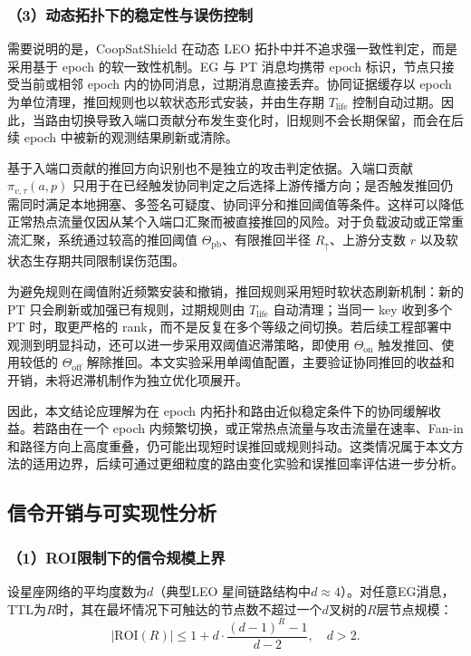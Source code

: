 \subsubsection*{（3）动态拓扑下的稳定性与误伤控制}

需要说明的是，CoopSatShield 在动态 LEO 拓扑中并不追求强一致性判定，而是采用基于 epoch 的软一致性机制。EG 与 PT 消息均携带 epoch 标识，节点只接受当前或相邻 epoch 内的协同消息，过期消息直接丢弃。协同证据缓存以 epoch 为单位清理，推回规则也以软状态形式安装，并由生存期 $T_{\text{life}}$ 控制自动过期。因此，当路由切换导致入端口贡献分布发生变化时，旧规则不会长期保留，而会在后续 epoch 中被新的观测结果刷新或清除。

基于入端口贡献的推回方向识别也不是独立的攻击判定依据。入端口贡献 $\pi_{v,\tau}(a,p)$ 只用于在已经触发协同判定之后选择上游传播方向；是否触发推回仍需同时满足本地拥塞、多签名可疑度、协同评分和推回阈值等条件。这样可以降低正常热点流量仅因从某个入端口汇聚而被直接推回的风险。对于负载波动或正常重流汇聚，系统通过较高的推回阈值 $\Theta_{\text{pb}}$、有限推回半径 $R_{\uparrow}$、上游分支数 $r$ 以及软状态生存期共同限制误伤范围。

为避免规则在阈值附近频繁安装和撤销，推回规则采用短时软状态刷新机制：新的 PT 只会刷新或加强已有规则，过期规则由 $T_{\text{life}}$ 自动清理；当同一 key 收到多个 PT 时，取更严格的 rank，而不是反复在多个等级之间切换。若后续工程部署中观测到明显抖动，还可以进一步采用双阈值迟滞策略，即使用 $\Theta_{\text{on}}$ 触发推回、使用较低的 $\Theta_{\text{off}}$ 解除推回。本文实验采用单阈值配置，主要验证协同推回的收益和开销，未将迟滞机制作为独立优化项展开。

因此，本文结论应理解为在 epoch 内拓扑和路由近似稳定条件下的协同缓解收益。若路由在一个 epoch 内频繁切换，或正常热点流量与攻击流量在速率、Fan-in 和路径方向上高度重叠，仍可能出现短时误推回或规则抖动。这类情况属于本文方法的适用边界，后续可通过更细粒度的路由变化实验和误推回率评估进一步分析。

\subsection{信令开销与可实现性分析}
\label{subsec:ch4_overhead}

\subsubsection*{（1）ROI限制下的信令规模上界}
设星座网络的平均度数为$d$（典型LEO 星间链路结构中$d\approx4$）。对任意EG消息，TTL为$R$时，其在最坏情况下可触达的节点数不超过一个$d$叉树的$R$层节点规模：
\begin{equation}
| \text{ROI}(R) | \le 1 + d\cdot \frac{(d-1)^R - 1}{d-2},\quad d>2.
\label{eq:roi_bound}
\end{equation}

